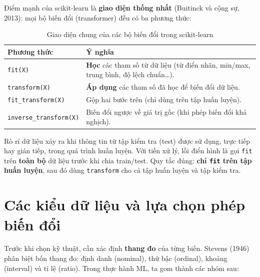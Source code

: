 Điểm mạnh của scikit-learn là \textbf{giao diện thống nhất} (Buitinck và cộng sự, 2013): mọi bộ biến đổi (transformer) đều có ba phương thức:

\begin{table}[H]
\centering
\begin{tabular}{|l|p{10cm}|}
\hline
\textbf{Phương thức} & \textbf{Ý nghĩa} \\
\hline
\texttt{fit(X)} & \textbf{Học} các tham số từ dữ liệu (từ điển nhãn, min/max, trung bình, độ lệch chuẩn\ldots). \\
\hline
\texttt{transform(X)} & \textbf{Áp dụng} các tham số đã học để biến đổi dữ liệu. \\
\hline
\texttt{fit\_transform(X)} & Gộp hai bước trên (chỉ dùng trên tập huấn luyện). \\
\hline
\texttt{inverse\_transform(X)} & Biến đổi ngược về giá trị gốc (khi phép biến đổi khả nghịch). \\
\hline
\end{tabular}
\caption{Giao diện chung của các bộ biến đổi trong scikit-learn}
\end{table}

\begin{definition}
Rò rỉ dữ liệu xảy ra khi thông tin từ tập kiểm tra (test) được sử dụng, trực tiếp hay gián tiếp, trong quá trình huấn luyện. Với tiền xử lý, lỗi điển hình là gọi \texttt{fit} trên \textbf{toàn bộ} dữ liệu trước khi chia train/test. Quy tắc đúng: \textbf{chỉ \texttt{fit} trên tập huấn luyện}, sau đó dùng \texttt{transform} cho cả tập huấn luyện và tập kiểm tra.
\end{definition}

\section{Các kiểu dữ liệu và lựa chọn phép biến đổi}

Trước khi chọn kỹ thuật, cần xác định \textbf{thang đo} của từng biến. Stevens (1946) phân biệt bốn thang đo: định danh (nominal), thứ bậc (ordinal), khoảng (interval) và tỉ lệ (ratio). Trong thực hành ML, ta gom thành các nhóm sau:

